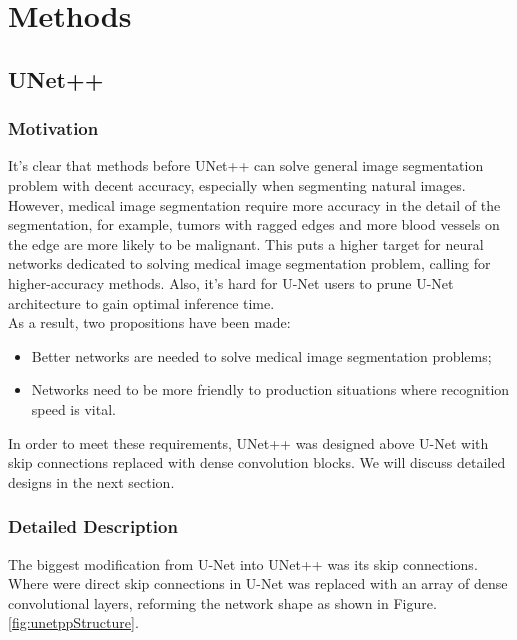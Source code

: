 \section{Methods}
\subsection{UNet++}
\subsubsection{Motivation}
It's clear that methods before UNet++\cite{unet_pp} can solve general image segmentation problem with decent accuracy, especially when segmenting natural images. However, medical image segmentation require more accuracy in the detail of the segmentation, for example, tumors with ragged edges and more blood vessels on the edge are more likely to be malignant. This puts a higher target for neural networks dedicated to solving medical image segmentation problem, calling for higher-accuracy methods. Also, it's hard for U-Net users to prune U-Net architecture to gain optimal inference time.\\
As a result, two propositions have been made:
\begin{itemize}
    \item Better networks are needed to solve medical image segmentation problems;
    \item Networks need to be more friendly to production situations where recognition speed is vital.
\end{itemize}
In order to meet these requirements, UNet++ was designed above U-Net\cite{unet} with skip connections replaced with dense convolution blocks. We will discuss detailed designs in the next section.

\subsubsection{Detailed Description}
The biggest modification from U-Net into UNet++ was its skip connections. Where were direct skip connections in U-Net was replaced with an array of dense convolutional layers, reforming the network shape as shown in Figure.\ref{fig:unetppStructure}.

